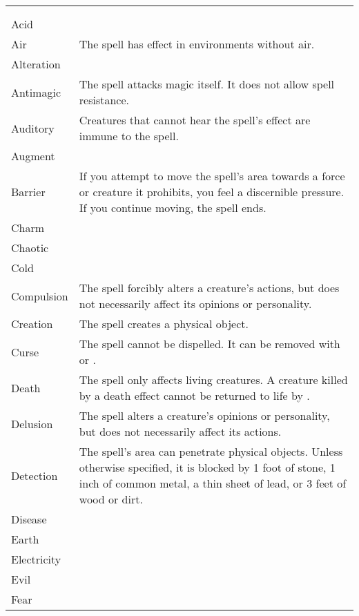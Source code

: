 {
    \onecolumn
    \begin{longtabu}{l X}
         \\
         &  \\
        Acid & \x \\
        Air & The spell has effect in environments without air. \\
        Alteration & \x \\
        Antimagic & The spell attacks magic itself. It does not allow spell resistance. \\
        Auditory & Creatures that cannot hear the spell's effect are immune to the spell. \\
        Augment & \x \\
        Barrier & If you attempt to move the spell's area towards a force or creature it prohibits, you feel a discernible pressure. If you continue moving, the spell ends. \\
        Charm & \x \\
        Chaotic & \x \\
        Cold & \x \\
        Compulsion & The spell forcibly alters a creature's actions, but does not necessarily affect its opinions or personality. \\
        Creation & The spell creates a physical object. \\
        Curse & The spell cannot be dispelled. It can be removed with  or . \\
        Death & The spell only affects living creatures. A creature killed by a death effect cannot be returned to life by . \\
        Delusion & The spell alters a creature's opinions or personality, but does not necessarily affect its actions. \\
        Detection & The spell's area can penetrate physical objects. Unless otherwise specified, it is blocked by 1 foot of stone, 1 inch of common metal, a thin sheet of lead, or 3 feet of wood or dirt. \\
        Disease & \x \\
        Earth & \x \\
        Electricity & \x \\
        Evil & \x \\
        Fear & \x \\

\end{longtabu}}
